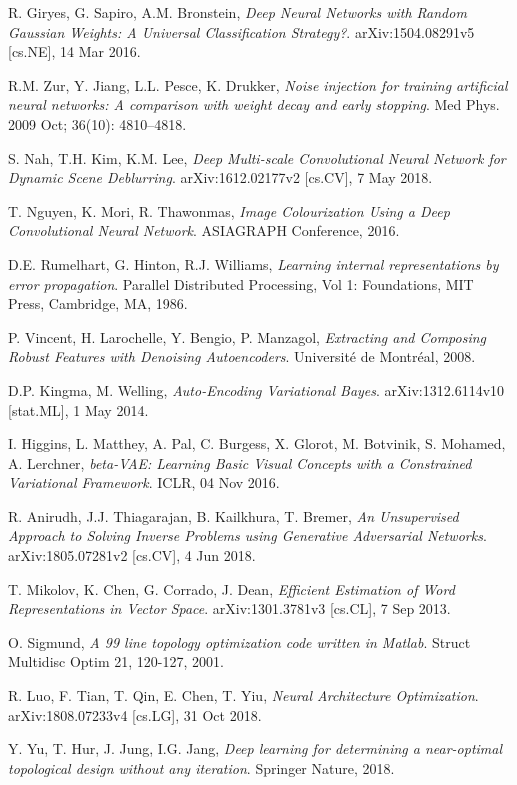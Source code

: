 \documentclass[a4paper]{article}
\begin{document}
\begin{thebibliography}{999}
  R. Giryes, G. Sapiro, A.M. Bronstein,
  \emph{Deep Neural Networks with Random Gaussian Weights: A Universal Classification Strategy?}.
  arXiv:1504.08291v5 [cs.NE],
  14 Mar 2016.

  R.M. Zur, Y. Jiang, L.L. Pesce, K. Drukker,
  \emph{Noise injection for training artificial neural networks: A comparison with weight decay and early stopping}.
  Med Phys.
  2009 Oct;
  36(10): 4810–4818.

  S. Nah, T.H. Kim, K.M. Lee,
  \emph{Deep Multi-scale Convolutional Neural Network for Dynamic Scene Deblurring}.
  arXiv:1612.02177v2 [cs.CV],
  7 May 2018.

  T. Nguyen, K. Mori, R. Thawonmas,
  \emph{Image Colourization Using a Deep Convolutional Neural Network}.
  ASIAGRAPH Conference,
  2016.

  D.E. Rumelhart, G. Hinton, R.J. Williams,
  \emph{Learning internal representations by error propagation}.
  Parallel Distributed Processing,
  Vol 1: Foundations,
  MIT Press,
  Cambridge, MA,
  1986.

  P. Vincent, H. Larochelle, Y. Bengio, P. Manzagol,
  \emph{Extracting and Composing Robust Features with Denoising Autoencoders}.
  Universit\'e de Montr\'eal,
  2008.

  D.P. Kingma, M. Welling,
  \emph{Auto-Encoding Variational Bayes}.
  arXiv:1312.6114v10 [stat.ML],
  1 May 2014.

  I. Higgins, L. Matthey, A. Pal, C. Burgess, X. Glorot, M. Botvinik, S. Mohamed, A. Lerchner,
  \emph{beta-VAE: Learning Basic Visual Concepts with a Constrained Variational Framework}.
  ICLR,
  04 Nov 2016.

  R. Anirudh, J.J. Thiagarajan, B. Kailkhura, T. Bremer,
  \emph{An Unsupervised Approach to Solving Inverse Problems using Generative Adversarial Networks}.
  arXiv:1805.07281v2 [cs.CV],
  4 Jun 2018.


  T. Mikolov, K. Chen, G. Corrado, J. Dean,
  \emph{Efficient Estimation of Word Representations in Vector Space}.
  arXiv:1301.3781v3 [cs.CL],
  7 Sep 2013.

  O. Sigmund,
  \emph{A 99 line topology optimization code written in Matlab}.
  Struct Multidisc Optim 21,
  120-127,
  2001.

  R. Luo, F. Tian, T. Qin, E. Chen, T. Yiu,
  \emph{Neural Architecture Optimization}.
  arXiv:1808.07233v4 [cs.LG],
  31 Oct 2018.

  Y. Yu, T. Hur, J. Jung, I.G. Jang,
  \emph{Deep learning for determining a near-optimal topological design without any iteration}.
  Springer Nature,
  2018.

\end{thebibliography}
\end{document}

